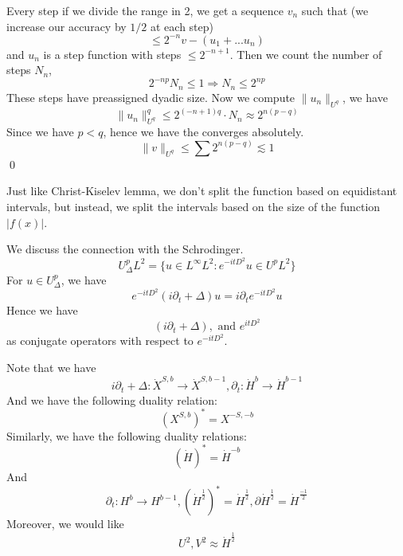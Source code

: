 Every step if we divide the range in 2, we get a sequence $v_n$ such that (we increase our accuracy by $1/2$ at each step)
\begin{equation*}\leq 2^{-n}
    v-(u_1+... u_n)
\end{equation*}
and $u_n$ is a step function with steps $\leq 2^{-n+1}$. Then we count the number of steps $N_n$,
\begin{equation*}
    2^{-np}N_n\leq 1\Rightarrow N_n\leq 2^{np}
\end{equation*}
These steps have preassigned dyadic size. Now we compute $\|u_n\|_{U^q}$, we have
\begin{equation*}
    \|u_n\|_{U^q}^q\leq 2^{(-n+1)q}\cdot N_n\approx 2^{n(p-q)}
\end{equation*}
Since we have $p<q$, hence we have the converges absolutely.
\begin{equation*}
    \|v\|_{U^q}\leq\sum 2^{n(p-q)}\lesssim 1
\end{equation*}
\qed

\begin{remark}
    Just like Christ-Kiselev lemma, we don't split the function based on equidistant intervals, but instead, we split the intervals based on the size of the function $|f(x)|$.
\end{remark}

We discuss the connection with the Schrodinger.
\begin{equation*}
    U_\Delta^p L^2=\{u\in L^\infty L^2: e^{-itD^2}u\in U^pL^2\}
\end{equation*}
For $u\in U_\Delta^p$, we have
\begin{equation*}
    e^{-itD^2}(i\partial_t+\Delta)u=i\partial_t e^{-itD^2}u
\end{equation*}
Hence we have 
\begin{equation*}
    (i\partial_t+\Delta), \text{ and } e^{itD^2}
\end{equation*}
as conjugate operators with respect to $e^{-itD^2}$.

Note that we have
\begin{equation*}
    i\partial_t+\Delta: \dot{X}^{S,b}\to\dot{X}^{S, b-1}, \partial_t: \dot{H}^b\to \dot{H}^{b-1}
\end{equation*}
And we have the following duality relation:
\begin{equation*}
    \left(X^{S,b} \right)^*=X^{-S, -b}
\end{equation*}
Similarly, we have the following duality relations:
\begin{equation*}
    \left(\dot{H} \right)^*=\dot{H}^{-b}
\end{equation*}
And
\begin{equation*}
    \partial_t: H^b\to H^{b-1}, \left(\dot{H}^\frac{1}{2} \right)^*=\dot{H}^\frac{1}{2}, \partial\dot{H}^\frac{1}{2}=\dot{H}^\frac{-1}{2}
\end{equation*}
Moreover, we would like
\begin{equation*}
    U^2, V^2\approx \dot{H}^\frac{1}{2}
\end{equation*}

